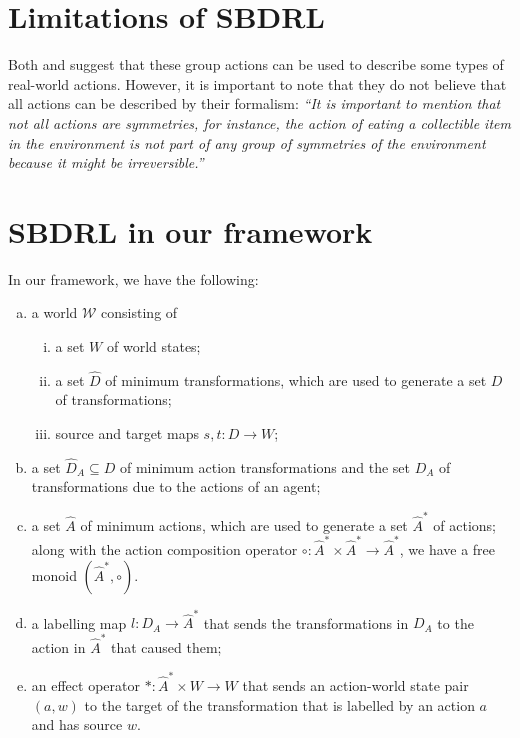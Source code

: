 \section{Limitations of SBDRL}


Both \autocite{Higgins2018} and \autocite{caselles2019symmetry} suggest that these group actions can be used to describe some types of real-world actions.
However, it is important to note that they do not believe that all actions can be described by their formalism: \textit{``It is important to mention that not all actions are symmetries, for instance, the action of eating a collectible item in the environment is not part of any group of symmetries of the environment because it might be irreversible.''}

\section{SBDRL in our framework}

In our framework, we have the following:
\begin{enumerate}[(a)]
    \item a world $\mathscr{W}$ consisting of
    \begin{enumerate}[(i)]
        \item a set $W$ of world states;
        \item a set $\hat{D}$ of minimum transformations, which are used to generate a set $D$ of transformations;
        \item source and target maps $s, t: D \to W$;
    \end{enumerate}

    \item a set $\hat{D}_{A} \subseteq D$ of minimum action transformations and the set $D_{A}$ of transformations due to the actions of an agent;
    \item a set $\hat{A}$ of minimum actions, which are used to generate a set $\hat{A}^{\ast}$ of actions; along with the action composition operator $\circ: \hat{A}^{*} \times \hat{A}^{*} \to \hat{A}^{*}$, we have a free monoid $(\hat{A}^{*}, \circ)$.
    \item a labelling map $l: D_{A} \to \hat{A}^{\ast}$ that sends the transformations in $D_{A}$ to the action in $\hat{A}^{\ast}$ that caused them;
    \item an effect operator $\ast : \hat{A}^{*} \times W \to W$ that sends an action-world state pair $(a, w)$ to the target of the transformation that is labelled by an action $a$ and has source $w$.
\end{enumerate}

